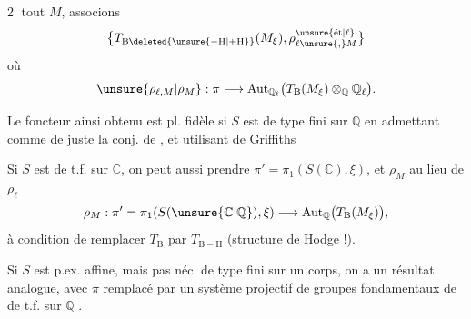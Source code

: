 \textcircled{2}    tout $M$, associons
\[
\bigl\{T_{\mathrm B\deleted{\unsure{-\mathrm H|+\mathrm H}}}(M_\xi),\rho_{\ell\unsure{,}M}^{\unsure{\text{ét}|\ell}}\bigr\}
\]
  où
\[
\unsure{\rho_{\ell,M}|\rho_M}:\pi\longrightarrow\operatorname{Aut}_{\mathbb Q_\ell}\bigl(T_{\mathrm B}(M_\xi)\otimes_{\mathbb Q}\mathbb Q_\ell\bigr).
\]

Le foncteur ainsi obtenu est pl. fidèle si $S$ est  de type fini sur $\mathbb Q$ \unsure{,} en admettant comme de juste la conj. de , et utilisant  de Griffiths

Si $S$ est  de t.f. sur $\mathbb C$, on peut aussi prendre $\pi'=\pi_1(S(\mathbb C),\xi)$, et $\rho_M$ au lieu de $\rho_\ell$
\[
\rho_M:\pi'=\pi_1(S(\unsure{\mathbb C|\mathbb Q}),\xi)\longrightarrow\operatorname{Aut}_{\mathbb Q}\bigl(T_{\mathrm B}(M_\xi)\bigr),
\]
à condition de remplacer $T_{\mathrm B}$ par $T_{\mathrm{B-H}}$ (structure de Hodge !).

Si $S$ est p.ex. affine,  mais pas néc. de type fini sur un corps, on a un résultat analogue, avec $\pi$ remplacé par un système projectif de groupes fondamentaux de  de t.f. sur $\mathbb Q$ .

